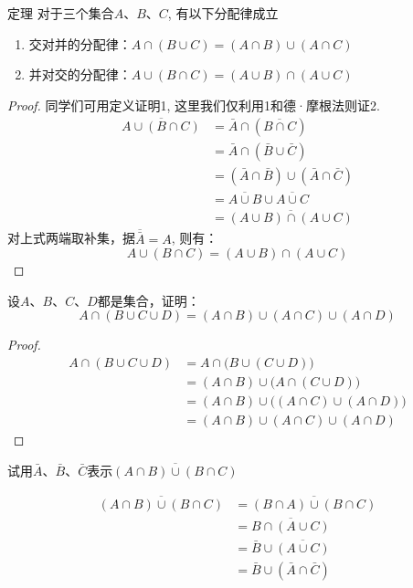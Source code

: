 \begin{blk}
  {定理} 对于三个集合$A$、$B$、$C$, 有以下分配律成立
\begin{enumerate}
  \item 交对并的分配律：$A\cap (B\cup C)=(A\cap B)\cup(A\cap C)$
  \item 并对交的分配律：$A\cup(B\cap C)=(A\cup B)\cap (A\cup C)$
\end{enumerate}
\end{blk}

\begin{proof}
  同学们可用定义证明1, 这里我们仅利用1和德·摩根法则证2.
\[\begin{split}
    \overline{A \cup(B \cap C)} &=\bar{A} \cap(\overline{B \cap C}) \\
    &=\bar{A} \cap(\bar{B} \cup \bar{C}) \\
    &=(\bar{A} \cap \bar{B}) \cup(\bar{A} \cap \bar{C}) \\
    &=\overline{A \cup B} \cup \overline{A \cup C} \\
    &=\overline{(A \cup B) \cap(A \cup C)}
\end{split}\]
对上式两端取补集，据$\overline{\bar A}=A$, 则有：
\[A\cup (B\cap C)=(A\cup B) \cap (A\cup C)\]
\end{proof}

\begin{example}
  设$A$、$B$、$C$、$D$都是集合，证明：
\[A\cap (B\cup C\cup D)=(A\cap B)\cup (A\cap C)\cup (A\cap D)\]
\end{example}

\begin{proof}
\begin{align*}
  A\cap (B\cup C\cup D)&= A\cap \big(B\cup(C\cup D)\big)  \tag{结合律}\\
  &=(A\cap B)\cup \big(A\cap (C\cup D)\big)  \tag{分配律}\\
  &=(A\cap B)\cup \big((A\cap C)\cup  (A\cap D)\big)\tag{分配律}\\
  &=(A\cap B)\cup (A\cap C)\cup  (A\cap D)  \tag{结合律}
\end{align*}
\end{proof}

\begin{example}
  试用$\bar A$、$\bar B$、$\bar C$表示$\overline{(A\cap B)\cup (B\cap C)}$
\end{example}


\begin{solution}
\begin{align*}
  \overline{(A\cap B)\cup (B\cap C)}&=\overline{(B\cap A)\cup (B\cap C)}  \tag{交换律}\\
  &=\overline{B\cap (A\cup C)} \tag{分配律}\\
  &=\bar B\cup \overline{(A\cup C)} \tag{德·摩根法则}\\
  &=\bar B\cup (\bar A\cap \bar C) \tag{德·摩根法则} 
\end{align*} 
\end{solution}
  


